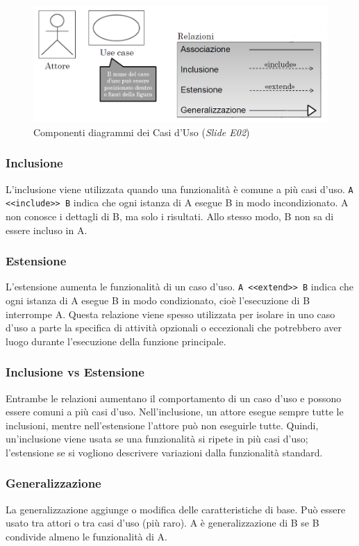 \begin{figure}[H]
\centering
    \includegraphics[width=1\textwidth]{res/img/componentiUseCaseDiagram}
    \caption{Componenti diagrammi dei Casi d'Uso (\textit{Slide E02})}
\end{figure}

\subsubsection{Inclusione}
L'inclusione viene utilizzata quando una funzionalità è comune a più casi d'uso. 
\texttt{A <<include>> B} indica che ogni istanza di A esegue B in modo incondizionato. 
A non conosce i dettagli di B, ma solo i risultati. Allo stesso modo, B non sa di essere incluso in A.

\subsubsection{Estensione}
L'estensione aumenta le funzionalità di un caso d'uso. 
\texttt{A <<extend>> B} indica che ogni istanza di A esegue B in modo condizionato, cioè l'esecuzione di B interrompe A.
Questa relazione viene spesso utilizzata per isolare in uno caso d'uso a parte la specifica di attività opzionali 
o eccezionali che potrebbero aver luogo durante l'esecuzione della funzione principale.

\subsubsection{Inclusione vs Estensione}
Entrambe le relazioni aumentano il comportamento di un caso d'uso e possono essere comuni a più casi d'uso. 
Nell'inclusione, un attore esegue sempre tutte le inclusioni, mentre nell'estensione l'attore può non eseguirle tutte.
Quindi, un'inclusione viene usata se una funzionalità si ripete in più casi d'uso; 
l'estensione se si vogliono descrivere variazioni dalla funzionalità standard. 

\subsubsection{Generalizzazione}
La generalizzazione aggiunge o modifica delle caratteristiche di base. 
Può essere usato tra attori o tra casi d'uso (più raro). 
A è generalizzazione di B se B condivide almeno le funzionalità di A.

